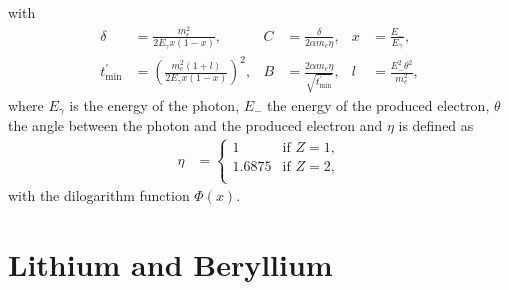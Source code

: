 \endgroup
%
with
%
\begin{align*}
	\delta &= \frac{m_e^2}{2 E_{\gamma} x (1-x)}, & C &= \frac{\delta}{2 \alpha m_e \eta}, & x &= \frac{E_{-}}{E_{\gamma}}, \\ t_{\text{min}}^{\prime} &= \left( \frac{m_e^2 (1+l)}{2 E_{\gamma} x (1-x)} \right)^2, & B &= \frac{2 \alpha m_e \eta}{\sqrt{t_{\text{min}}^{\prime}}}, & l &= \frac{E_-^2 \theta^2}{m_e^2},
\end{align*}
%
where $E_{\gamma}$ is the energy of the photon, $E_-$ the energy of the produced electron, $\theta$ the angle between the photon and the produced electron and $\eta$ is defined as
%
\begin{align*}
	\eta &= 
	\begin{cases}
		1 & \text{if $Z = 1$},\\
		1.6875 & \text{if $Z = 2$},\\
	\end{cases}
\end{align*}
%
with the dilogarithm function $\Phi(x)$.

\section{Lithium and Beryllium}

